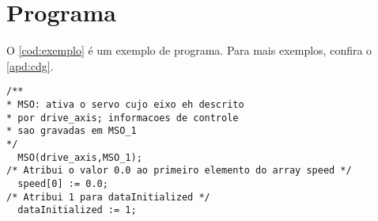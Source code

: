 \section{Programa}

O \cref{cod:exemplo} é um exemplo de programa. Para mais exemplos, confira o \cref{apd:cdg}.

\begin{lstlisting}[caption={Exemplo de programa},label={cod:exemplo}]
/**
* MSO: ativa o servo cujo eixo eh descrito
* por drive_axis; informacoes de controle
* sao gravadas em MSO_1
*/
  MSO(drive_axis,MSO_1);
/* Atribui o valor 0.0 ao primeiro elemento do array speed */
  speed[0] := 0.0; 
/* Atribui 1 para dataInitialized */
  dataInitialized := 1;
\end{lstlisting}